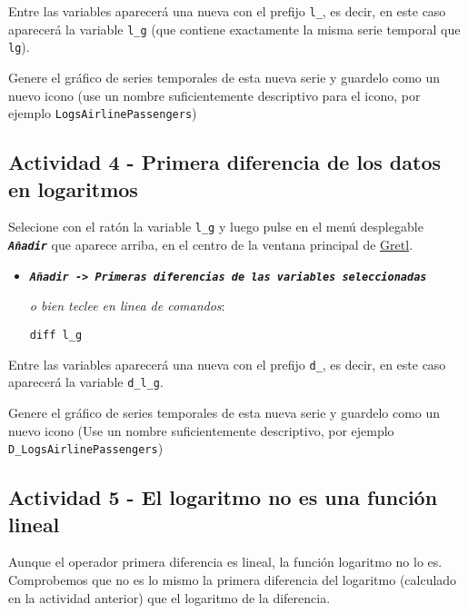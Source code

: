 \documentclass[11pt]{article}
\begin{document}
Entre las variables aparecerá una nueva con el prefijo \texttt{l\_}, es decir,
en este caso aparecerá la variable \texttt{l\_g} (que contiene exactamente la
misma serie temporal que \texttt{lg}).

Genere el gráfico de series temporales de esta nueva serie y guardelo
como un nuevo icono (use un nombre suficientemente descriptivo para el
icono, por ejemplo \texttt{LogsAirlinePassengers})

{\vspace{0pt} \footnotesize \color{gray!70!black}
}

\subsection{Actividad 4 - Primera diferencia de los datos en logaritmos}
\label{sec:orgb541fa9}

Selecione con el ratón la variable \texttt{l\_g} y luego pulse en el menú desplegable \textbf{\emph{\texttt{Añadir}}} que aparece arriba, en el centro de la
ventana principal de \href{https://gretl.sourceforge.net/es.html}{Gretl}.
\begin{itemize}
\item \textbf{\emph{\texttt{Añadir -> Primeras diferencias de las variables seleccionadas}}}

{\vspace{0pt} \footnotesize \color{gray!70!black}
\emph{o bien teclee en linea de comandos}: 
\begin{verbatim}
diff l_g
\end{verbatim}
}
\end{itemize}

Entre las variables aparecerá una nueva con el prefijo \texttt{d\_}, es decir,
en este caso aparecerá la variable \texttt{d\_l\_g}.

Genere el gráfico de series temporales de esta nueva serie y guardelo
como un nuevo icono (Use un nombre suficientemente descriptivo, por
ejemplo \texttt{D\_LogsAirlinePassengers})

{\vspace{0pt} \footnotesize \color{gray!70!black}
}

\subsection{Actividad 5 - El logaritmo no es una función lineal}
\label{sec:org3b2acbd}

Aunque el operador primera diferencia es lineal, la función logaritmo
no lo es. Comprobemos que no es lo mismo la primera diferencia del
logaritmo (calculado en la actividad anterior) que el logaritmo de la
diferencia.
\end{document}
